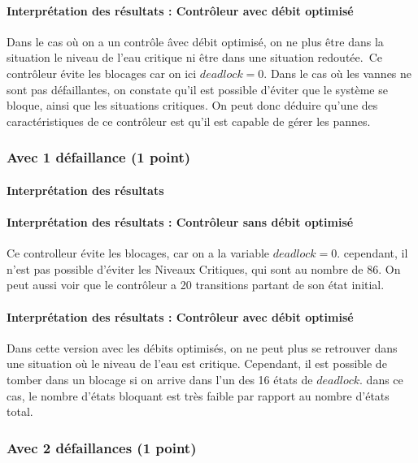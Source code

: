 \documentclass[a4paper]{book}
\begin{document}
\paragraph{Interprétation des résultats : Contrôleur avec débit optimisé}
Dans le cas où on a un contrôle âvec débit optimisé, on ne plus être dans la situation le niveau de l'eau critique ni être dans une situation redoutée.\
Ce contrôleur évite les blocages car on ici $deadlock = 0$. Dans le cas où les vannes ne sont pas défaillantes, on constate qu’il est possible d’éviter que le système se bloque, ainsi que les situations critiques.
On peut donc déduire qu’une des caractéristiques de ce contrôleur est qu’il est capable de gérer les pannes.


\subsubsection{Avec 1 défaillance (1 point)}


%
%
%
\paragraph{Interprétation des résultats}
\paragraph{Interprétation des résultats : Contrôleur sans débit optimisé}
Ce controlleur évite les blocages, car on a la variable $deadlock = 0$. cependant, il n'est pas possible d'éviter les Niveaux Critiques, qui sont au nombre de 86.
On peut aussi voir que le contrôleur a 20 transitions partant de son état initial.

\paragraph{Interprétation des résultats : Contrôleur avec débit optimisé}
Dans cette version avec les débits optimisés, on ne peut plus se retrouver dans une situation où le niveau de l'eau est critique. Cependant, il est possible de tomber dans un blocage si on arrive dans l'un des 16 états de $deadlock$.
dans ce cas, le nombre d'états bloquant est très faible par rapport au nombre d'états total.

\subsubsection{Avec 2 défaillances (1 point)}


%
%
%
\end{document}
